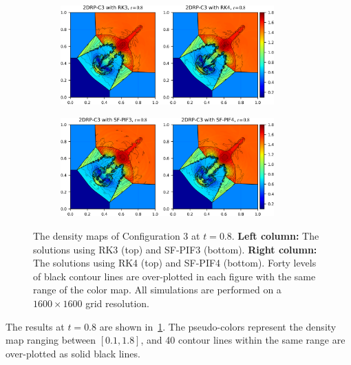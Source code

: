 \begin{figure}
    \centering
    \begin{subfigure}{140mm}
        \centering
        \includegraphics[width=0.9\textwidth]{fig/2drp_c3_weno5_rk_1600.png}
    \end{subfigure}
    \begin{subfigure}{140mm}
        \centering
        \includegraphics[width=0.9\textwidth]{fig/2drp_c3_weno5_sfPIF_1600.png}
    \end{subfigure}
    \caption{The density maps of Configuration 3 at \( t = 0.8 \).
        \textbf{Left column:} The solutions using RK3 (top) and SF-PIF3 (bottom).
        \textbf{Right column:} The solutions using RK4 (top) and SF-PIF4 (bottom).
        Forty levels of black contour lines are over-plotted in each figure
        with the same range of the color map.
        All simulations are performed on a \( 1600 \times 1600 \) grid resolution.
        }\label{fig:2drp_c3}
\end{figure}

The results at \( t = 0.8 \) are shown in~\cref{fig:2drp_c3}.
The pseudo-colors represent the density map ranging between \( [0.1, 1.8] \), and
40 contour lines within the same range are over-plotted as solid black lines.

